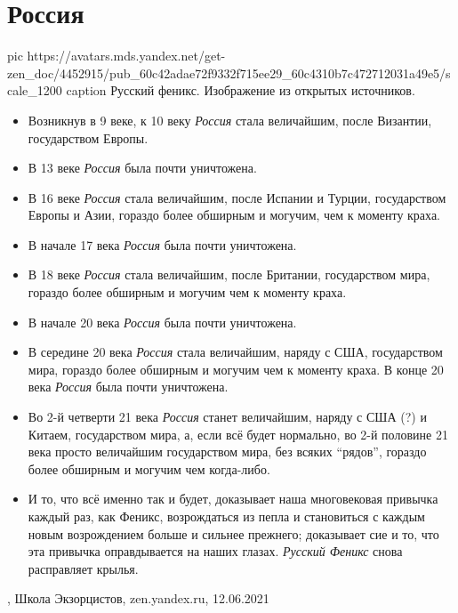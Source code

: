  
 
 
 
 
\chapter{Россия}
\label{sec:slova.rossia}

\ifcmt
  pic https://avatars.mds.yandex.net/get-zen_doc/4452915/pub_60c42adae72f9332f715ee29_60c4310b7c472712031a49e5/scale_1200
  caption Русский феникс. Изображение из открытых источников.
\fi
\begin{itemize}
\item Возникнув в 9 веке, к 10 веку \emph{Россия} стала величайшим, после Византии, государством Европы.
\item В 13 веке \emph{Россия} была почти уничтожена.
\item В 16 веке \emph{Россия} стала величайшим, после Испании и Турции, государством
Европы и Азии, гораздо более обширным и могучим, чем к моменту краха.
\item В начале 17 века \emph{Россия} была почти уничтожена.
\item В 18 веке \emph{Россия} стала величайшим, после Британии, государством мира, гораздо более обширным и могучим чем к моменту краха.
\item В начале 20 века \emph{Россия} была почти уничтожена.
\item В середине 20 века \emph{Россия} стала величайшим, наряду с США, государством
мира, гораздо более обширным и могучим чем к моменту краха.
В конце 20 века \emph{Россия} была почти уничтожена.
\item Во 2-й четверти 21 века \emph{Россия} станет величайшим, наряду с США (?) и Китаем,
государством мира, а, если всё будет нормально, во 2-й половине 21 века просто
величайшим государством мира, без всяких \enquote{рядов}, гораздо более
обширным и могучим чем когда-либо.
\item И то, что всё именно так и будет, доказывает наша многовековая привычка каждый
раз, как Феникс, возрождаться из пепла и становиться с каждым новым
возрождением больше и сильнее прежнего; доказывает сие и то, что эта привычка
оправдывается на наших глазах. \emph{Русский Феникс} снова расправляет крылья.
\end{itemize}
, 
Школа Экзорцистов, zen.yandex.ru, 12.06.2021


